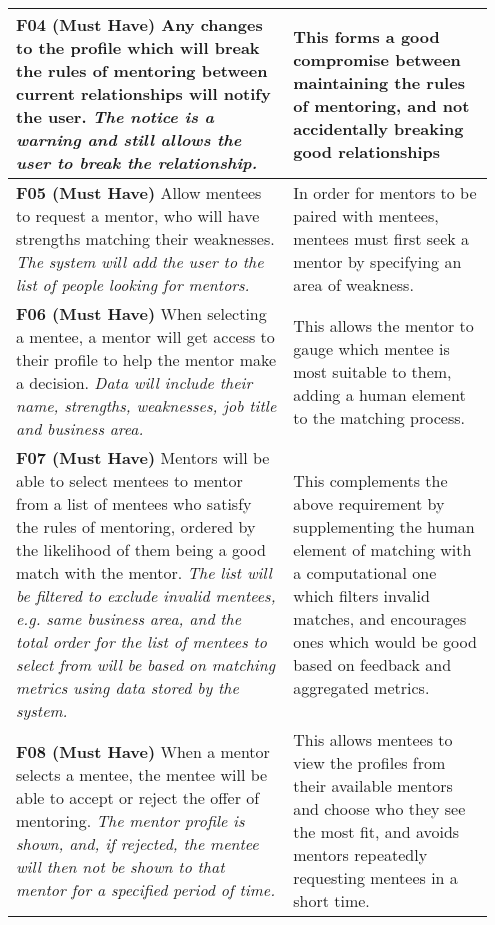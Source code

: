 \documentclass[10pt]{article}
\begin{document}
\begin{longtable}{|p{0.55\linewidth}|p{0.4\linewidth}|}
    \textbf{F04 (Must Have) }
    Any changes to the profile which will break the rules of mentoring between
    current relationships will notify the user.
    \textit{The notice is a warning and still allows the user to break the
    relationship.}
        &
    This forms a good compromise between maintaining the rules of mentoring,
    and not accidentally breaking good relationships
    \\ \hline

    \textbf{F05 (Must Have) }
    Allow mentees to request a mentor, who will have strengths matching their
    weaknesses.
    \textit{The system will add the user to the list of people looking for
    mentors.}
        &
    In order for mentors to be paired with mentees, mentees must first seek a
    mentor by specifying an area of weakness.
    \\ \hline

    \textbf{F06 (Must Have) }
    When selecting a mentee, a mentor will get access to their profile to help
    the mentor make a decision.
    \textit{Data will include their name, strengths, weaknesses, job title and
    business area.}
        &
    This allows the mentor to gauge which mentee is most suitable to them,
    adding a human element to the matching process.
    \\ \hline

    \textbf{F07 (Must Have) }
    Mentors will be able to select mentees to mentor from a list of mentees who
    satisfy the rules of mentoring, ordered by the likelihood of them being a
    good match with the mentor.
    \textit{The list will be filtered to exclude invalid mentees, e.g. same
    business area, and the total order for the list of mentees to select from
    will be based on matching metrics using data stored by the system.}             %
        &
    This complements the above requirement by supplementing the human element of
    matching with a computational one which filters invalid matches, and
    encourages ones which would be good based on feedback and aggregated
    metrics.
    \\ \hline

    \textbf{F08 (Must Have) }
    When a mentor selects a mentee, the mentee will be able to accept or reject
    the offer of mentoring.
    \textit{The mentor profile is shown, and, if rejected, the mentee will then
    not be shown to that mentor for a specified period of time.}
        &
    This allows mentees to view the profiles from their available mentors and
    choose who they see the most fit, and avoids mentors repeatedly requesting
    mentees in a short time.
    \\ \hline


\end{longtable}
\end{document}
